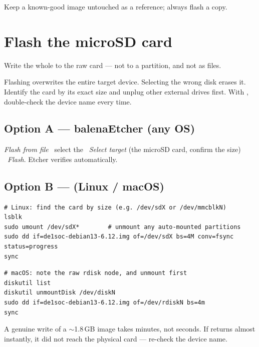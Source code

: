 \begin{tip}
Keep a known-good image untouched as a reference; always flash a copy.
\end{tip}

\section{Flash the microSD card}
Write the whole  to the raw card --- not to a partition, and not as files.

\begin{warn}
Flashing overwrites the entire target device. Selecting the wrong disk erases it.
Identify the card by its exact size and unplug other external drives first. With
, double-check the device name every time.
\end{warn}

\subsection{Option A --- balenaEtcher (any OS)}
\emph{Flash from file} \arr\ select the  \arr\ \emph{Select target} (the
microSD card, confirm the size) \arr\ \emph{Flash}. Etcher verifies automatically.

\subsection{Option B ---  (Linux / macOS)}
\begin{lstlisting}
# Linux: find the card by size (e.g. /dev/sdX or /dev/mmcblkN)
lsblk
sudo umount /dev/sdX*        # unmount any auto-mounted partitions
sudo dd if=de1soc-debian13-6.12.img of=/dev/sdX bs=4M conv=fsync status=progress
sync
\end{lstlisting}
\begin{lstlisting}
# macOS: note the raw rdisk node, and unmount first
diskutil list
diskutil unmountDisk /dev/diskN
sudo dd if=de1soc-debian13-6.12.img of=/dev/rdiskN bs=4m
sync
\end{lstlisting}
\begin{tip}
A genuine write of a $\sim$1.8\,GB image takes minutes, not seconds. If 
returns almost instantly, it did not reach the physical card --- re-check the device name.
\end{tip}

